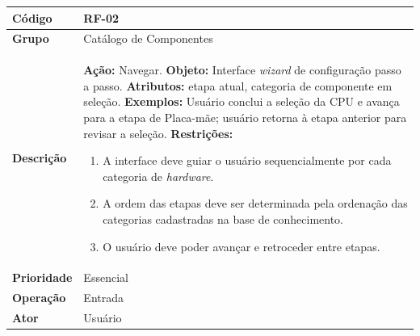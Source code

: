 \FloatBarrier
\begin{quadro}[htb]
  \caption{RF-02 -- Navegar pela interface \textit{wizard}}
  \label{quad:rf02}
  \begin{tabular}{|p{3.2cm}|p{11.8cm}|}
    \hline
    \textbf{Código}     & RF-02                                                                                       \\ \hline
    \textbf{Grupo}      & Catálogo de Componentes                                                                     \\ \hline
    \textbf{Descrição}  &
    \textbf{Ação:} Navegar.
    \textbf{Objeto:} Interface \textit{wizard} de configuração passo a passo.
    \textbf{Atributos:} etapa atual, categoria de componente em seleção.
    \textbf{Exemplos:} Usuário conclui a seleção da CPU e avança para a etapa de Placa-mãe; usuário retorna à etapa anterior para revisar a seleção.
    \textbf{Restrições:}
    \begin{enumerate}[nosep,leftmargin=1.2em,topsep=2pt,partopsep=0pt,parsep=0pt,itemsep=1pt]
      \item A interface deve guiar o usuário sequencialmente por cada categoria de \textit{hardware}.
      \item A ordem das etapas deve ser determinada pela ordenação das categorias cadastradas na base de conhecimento.
      \item O usuário deve poder avançar e retroceder entre etapas.
    \end{enumerate} \\ \hline
    \textbf{Prioridade} & Essencial                                                                                   \\ \hline
    \textbf{Operação}   & Entrada                                                                                     \\ \hline
    \textbf{Ator}       & Usuário                                                                                     \\ \hline
  \end{tabular}
\end{quadro}

